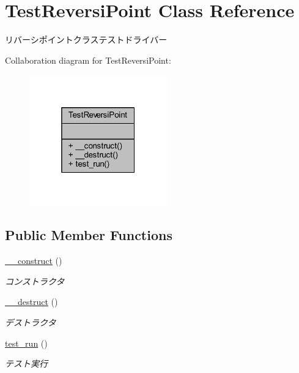 \hypertarget{class_test_reversi_point}{}\section{Test\+Reversi\+Point Class Reference}
\label{class_test_reversi_point}


リバーシポイントクラステストドライバー  




Collaboration diagram for Test\+Reversi\+Point\+:
\nopagebreak
\begin{figure}[H]
\begin{center}
\leavevmode
\includegraphics[width=169pt]{class_test_reversi_point__coll__graph}
\end{center}
\end{figure}
\subsection*{Public Member Functions}
\begin{DoxyCompactItemize}
\item 
\hyperlink{class_test_reversi_point_a095c5d389db211932136b53f25f39685}{\+\_\+\+\_\+construct} ()
\begin{DoxyCompactList}\small\item\em コンストラクタ \end{DoxyCompactList}\item 
\hyperlink{class_test_reversi_point_a421831a265621325e1fdd19aace0c758}{\+\_\+\+\_\+destruct} ()
\begin{DoxyCompactList}\small\item\em デストラクタ \end{DoxyCompactList}\item 
\hyperlink{class_test_reversi_point_a9b029832cfdf19c0ef36b1f5ef7b7735}{test\+\_\+run} ()
\begin{DoxyCompactList}\small\item\em テスト実行 \end{DoxyCompactList}\end{DoxyCompactItemize}


